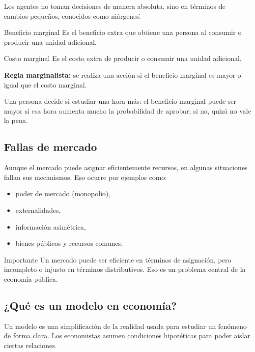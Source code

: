 Los agentes no toman decisiones de manera absoluta, sino en términos de cambios pequeños, conocidos como \'márgenes\'.

\begin{concepto}{Beneficio marginal}
Es el beneficio extra que obtiene una persona al consumir o producir una unidad adicional.
\end{concepto}

\begin{concepto}{Costo marginal}
Es el costo extra de producir o consumir una unidad adicional.
\end{concepto}

\textbf{Regla marginalista:} se realiza una acción si el beneficio marginal es mayor o igual que el costo marginal.

\begin{ejemplo}
Una persona decide si estudiar una hora más: el beneficio marginal puede ser mayor si esa hora aumenta mucho la probabilidad de aprobar; si no, quizá no vale la pena.
\end{ejemplo}

\subsection{Fallas de mercado}

Aunque el mercado puede asignar eficientemente recursos, en algunas situaciones fallan sus mecanismos. Eso ocurre por ejemplos como:
\begin{itemize}
    \item poder de mercado (monopolio),
    \item externalidades,
    \item información asimétrica,
    \item bienes públicos y recursos comunes.
\end{itemize}

\begin{observacion}{Importante}
Un mercado puede ser eficiente en términos de asignación, pero incompleto o injusto en términos distributivos. Eso es un problema central de la economía pública.
\end{observacion}

\subsection{¿Qué es un modelo en economía?}

Un modelo es una simplificación de la realidad usada para estudiar un fenómeno de forma clara. Los economistas asumen condiciones hipotéticas para poder aislar ciertas relaciones.

